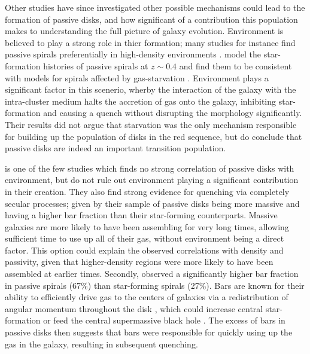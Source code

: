 \documentclass[useAMS,usenatbib]{mn2e}
\begin{document}
Other studies have since investigated other possible mechanisms could lead to the formation of passive disks, and how significant of a contribution this population makes to understanding the full picture of galaxy evolution. Environment is believed to play a strong role in thier formation; many studies for instance find passive spirals preferentially in high-density environments \citep{Dressler1999, Poggianti1999, Goto2003, Deng2009, Hughes2009}. \citet{Moran2006} model the star-formation histories of passive spirals at $z\sim0.4$ and find them to be consistent with models for spirals affected by gas-starvation \citep{Larson1980, Quilis2000, Bekki2002}. Environment plays a significant factor in this scenerio, wherby the interaction of the galaxy with the intra-cluster medium halts the accretion of gas onto the galaxy, inhibiting star-formation and causing a quench without disrupting the morphology significantly. Their results did not argue that starvation was the only mechanism responsible for building up the population of disks in the red sequence, but do conclude that passive disks are indeed an important transition population.

\citet{Masters2010} is one of the few studies which finds no strong correlation of passive disks with environment, but do not rule out environment playing a significant contribution in their creation. They also find strong evidence for quenching via completely secular processes; given by their sample of passive disks being more massive and having a higher bar fraction than their star-forming counterparts. Massive galaxies are more likely to have been assembling for very long times, allowing sufficient time to use up all of their gas, without environment being a direct factor. This option could explain the observed correlations with density and passivity, given that higher-density regions were more likely to have been assembled at earlier times. Secondly, \citet{Masters2010} observed a significantly higher bar fraction in passive spirals (67\%) than star-forming spirals (27\%). Bars are known for their ability to efficiently drive gas to the centers of galaxies via a redistribution of angular momentum throughout the disk \citep{Sellwood1993,Shlosman1989,Ann2005}, which could increase central star-formation \citep{Hawarden1986,Ho1997} or feed the central supermassive black hole \citep{Athanassoula1992,Friedli1993}. The excess of bars in passive disks then suggests that bars were responsible for quickly using up the gas in the galaxy, resulting in subsequent quenching. 
\end{document}
